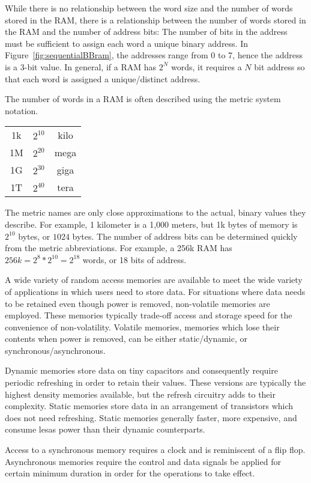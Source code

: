 While there is no relationship between the word size and the number of
words stored in the RAM, there is a relationship between the number
of words stored in the RAM and the number of address bits:
The number of bits in the address must be sufficient to assign
each word a unique binary address.  In Figure~\ref{fig:sequentialBBram}, the
addresses range from 0 to 7, hence the address is a 3-bit value.   In general,
if a RAM has $2^N$ words, it requires a  $N$ bit address so that each word
is assigned a unique/distinct address.

The number of words in a RAM is often described using the metric system notation.

\begin{tabular}{ccc}
1k & $2^{10}$ & kilo \\
1M & $2^{20}$ & mega \\
1G & $2^{30}$ & giga \\
1T & $2^{40}$ & tera \\
\end{tabular}

The metric names are only close approximations to the actual, binary values
they describe.  For example, 1 kilometer is a 1,000 meters, but
1k bytes of memory is $2^{10}$ bytes, or $1024$ bytes.  The number of
address bits can be determined quickly from the metric abbreviations.
For example, a 256k RAM has $256k=2^8*2^{10}=2^{18}$ words, or 18 bits
of address.

A wide variety of random access memories are available to meet the wide
variety of applications in which users need to store data.  For situations where
data needs to be retained even though power is removed, non-volatile memories are employed.
These memories typically trade-off access and storage speed for the
convenience of non-volatility.  Volatile memories, memories which lose
their contents when power is removed, can be either static/dynamic, or
synchronous/asynchronous.

Dynamic memories store data on tiny capacitors and
consequently require periodic refreshing in order to retain their values.  These versions
are typically the highest density memories available, but the refresh circuitry
adds to their complexity.  Static memories store data in an arrangement
of transistors which does not need refreshing.  Static memories generally
faster, more expensive, and consume lesas power than their dynamic counterparts.

Access to a synchronous memory requires a clock and is reminiscent of a flip flop.
Asynchronous memories require the control and data signals be applied
for certain minimum duration in order for the operations to take effect.

